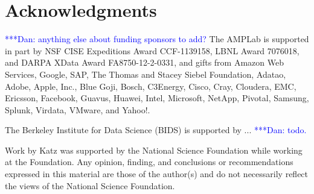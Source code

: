 \documentclass{sig-alternate}
\newcommand{\katznote}[1]{ {\textcolor{blue}    { ***Dan:      #1 }}}
\newcommand{\zhaonote}[1]{{\textcolor{cyan}    { ***Zhao:      #1 }}}
\newcommand{\katznote}[1]{}
\newcommand{\zhaonote}[1]{}
\begin{document}
\section{Acknowledgments}
\katznote{anything else about funding sponsors to add?}
The AMPLab is supported in part by NSF CISE Expeditions Award CCF-1139158, LBNL Award 7076018, and DARPA XData Award FA8750-12-2-0331, and gifts from Amazon Web Services, Google, SAP,  The Thomas and Stacey Siebel Foundation, Adatao, Adobe, Apple, Inc., Blue Goji, Bosch, C3Energy, Cisco, Cray, Cloudera, EMC, Ericsson, Facebook, Guavus, Huawei, Intel, Microsoft, NetApp, Pivotal, Samsung, Splunk, Virdata, VMware, and Yahoo!. 

The Berkeley Institute for Data Science (BIDS) is  supported by ... \katznote{todo.} 


Work by Katz was supported by the National
Science Foundation while working at the Foundation.  Any opinion, finding, and
conclusions or recommendations expressed in this material are those of the
author(s) and do not necessarily reflect the views of the National Science
Foundation.





\end{document}
